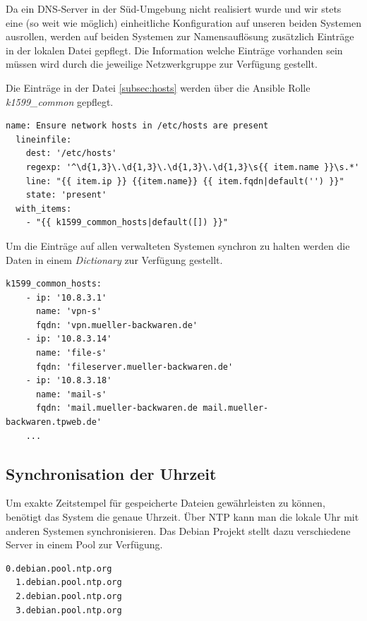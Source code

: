 Da ein DNS-Server in der Süd-Umgebung nicht realisiert wurde und wir stets eine (so weit wie möglich) einheitliche Konfiguration auf unseren beiden Systemen ausrollen, werden auf beiden Systemen zur Namensauflösung zusätzlich Einträge in der lokalen  Datei gepflegt. Die Information welche Einträge vorhanden sein müssen wird durch die jeweilige Netzwerkgruppe zur Verfügung gestellt.

Die Einträge in der Datei \ref{subsec:hosts} werden über die Ansible Rolle \textit{k1599\_common} gepflegt.

\begin{lstlisting}[label=code:denyany,caption=Auszug aus ansible/roles/k1599\_common/tasks/main.yml]
  name: Ensure network hosts in /etc/hosts are present
  lineinfile:
    dest: '/etc/hosts'
    regexp: '^\d{1,3}\.\d{1,3}\.\d{1,3}\.\d{1,3}\s{{ item.name }}\s.*'
    line: "{{ item.ip }} {{item.name}} {{ item.fqdn|default('') }}"
    state: 'present'
  with_items:
    - "{{ k1599_common_hosts|default([]) }}"
\end{lstlisting}

Um die Einträge auf allen verwalteten Systemen synchron zu halten werden die Daten in einem \textit{Dictionary} zur Verfügung gestellt.

\begin{lstlisting}[label=code:denyany,caption=Auszug aus ansible/group\_vars/all]
  k1599_common_hosts:
    - ip: '10.8.3.1'
      name: 'vpn-s'
      fqdn: 'vpn.mueller-backwaren.de'
    - ip: '10.8.3.14'
      name: 'file-s'
      fqdn: 'fileserver.mueller-backwaren.de'
    - ip: '10.8.3.18'
      name: 'mail-s'
      fqdn: 'mail.mueller-backwaren.de mail.mueller-backwaren.tpweb.de'
    ...
\end{lstlisting}

\subsection{Synchronisation der Uhrzeit}
Um exakte Zeitstempel für gespeicherte Dateien gewährleisten zu können, benötigt das System die genaue Uhrzeit. Über NTP kann man die lokale Uhr mit anderen Systemen synchronisieren. Das Debian Projekt stellt dazu verschiedene Server in einem Pool zur Verfügung.

\begin{lstlisting}[label=code:ntp,caption=Debian NTP Server]
  0.debian.pool.ntp.org
  1.debian.pool.ntp.org
  2.debian.pool.ntp.org
  3.debian.pool.ntp.org
\end{lstlisting}

